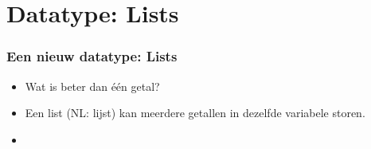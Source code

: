 \section{Datatype: Lists}


\begin{frame}
\frametitle{Een nieuw datatype: Lists}

\begin{itemize}
  \item<1-> Wat is beter dan \'e\'en getal?
  \item<3-> Een list (NL: lijst) kan meerdere getallen in dezelfde variabele storen.
  \item<4->
\end{itemize}

\end{frame}






